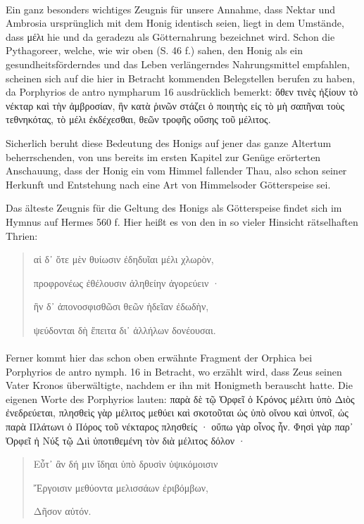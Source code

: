 \documentclass[a4paper, 11pt, oneside]{article}
\begin{document}
\paragraph{}
Ein ganz besonders wichtiges Zeugnis für unsere Annahme, dass Nektar und Ambrosia ursprünglich mit dem Honig identisch seien, liegt in dem Umstände, dass μέλι hie und da geradezu als Götternahrung bezeichnet wird. Schon die Pythagoreer, welche, wie wir oben (S. 46 f.) sahen, den Honig als ein gesundheitsförderndes und das Leben verlängerndes Nahrungsmittel empfahlen, scheinen sich auf die hier in Betracht kommenden Belegstellen berufen zu haben, da Porphyrios de antro nympharum 16 ausdrücklich bemerkt: ὅθεν τινὲς ἠξίουν τὸ νέκταρ καὶ τὴν ἀμβροσίαν, ἣν κατὰ ῥινῶν στάζει ὁ ποιητὴς εἰς τὸ μὴ σαπῆναι τοὺς τεθνηκότας, τὸ μέλι ἐκδέχεσθαι, θεῶν τροφῆς οὔσης τοῦ μέλιτος.

Sicherlich beruht diese Bedeutung des Honigs auf jener das ganze Altertum beherrschenden, von uns bereits im ersten Kapitel zur Genüge erörterten Anschauung, dass der Honig ein vom Himmel fallender Thau, also schon seiner Herkunft und Entstehung nach eine Art von Himmelsoder Götterspeise sei.

Das älteste Zeugnis für die Geltung des Honigs als Götterspeise findet sich im Hymnus auf Hermes 560 f. Hier heißt es von den in so vieler Hinsicht rätselhaften Thrien:
\begin{quotation}
αἱ δ᾽ ὅτε μὲν θυίωσιν ἐδηδυῖαι μέλι χλωρὸν,

προφρονέως ἐθέλουσιν ἀληθείην ἀγορεύειν ·

ἣν δ᾽ ἀπονοσφισθῶσι θεῶν ἡδεῖαν ἐδωδὴν,

ψεύδονται δὴ ἔπειτα δι᾽ ἀλλήλων δονέουσαι.
\end{quotation}
\paragraph{}
Ferner kommt hier das schon oben erwähnte Fragment der Orphica bei Porphyrios de antro nymph. 16 in Betracht, wo erzählt wird, dass Zeus seinen Vater Kronos überwältigte, nachdem er ihn mit Honigmeth berauscht hatte. Die eigenen Worte des Porphyrios lauten: παρὰ δὲ τῷ Ὀρφεῖ ὁ Κρόνος μέλιτι ὑπὸ Διὸς ἐνεδρεύεται, πλησθεὶς γὰρ μέλιτος μεθύει καὶ σκοτοῦται ὡς ὑπὸ οἴνου καὶ ὑπνοῖ, ὡς παρὰ Πλάτωνι ὁ Πόρος τοῦ νέκταρος πλησθείς · οὔπω γὰρ οἷνος ἦν. Φησὶ γὰρ παρ᾽ Ὀρφεῖ ἡ Νύξ τῷ Διὶ ὑποτιθεμένη τὸν διὰ μέλιτος δόλον ·
\begin{quotation}
Εὖτ᾽ ἂν δή μιν ἴδηαι ὑπὸ δρυσὶν ὑψικόμοισιν

Ἔργοισιν μεθύοντα μελισσάων ἐριβόμβων,

Δῆσον αὐτόν.
\end{quotation}
\end{document}

